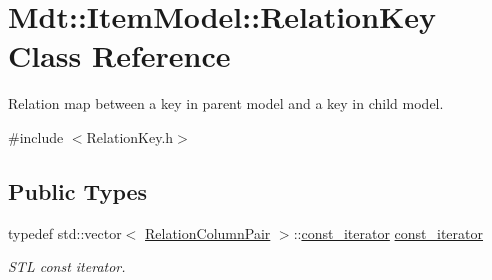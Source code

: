 \hypertarget{class_mdt_1_1_item_model_1_1_relation_key}{}\section{Mdt\+:\+:Item\+Model\+:\+:Relation\+Key Class Reference}
\label{class_mdt_1_1_item_model_1_1_relation_key}


Relation map between a key in parent model and a key in child model.  




{\ttfamily \#include $<$Relation\+Key.\+h$>$}

\subsection*{Public Types}
\begin{DoxyCompactItemize}
\item 
typedef std\+::vector$<$ \hyperlink{class_mdt_1_1_item_model_1_1_relation_column_pair}{Relation\+Column\+Pair} $>$\+::\hyperlink{class_mdt_1_1_item_model_1_1_relation_key_a9f5e75ac5ac158d06a10f1114f9d8b5d}{const\+\_\+iterator} \hyperlink{class_mdt_1_1_item_model_1_1_relation_key_a9f5e75ac5ac158d06a10f1114f9d8b5d}{const\+\_\+iterator}\hypertarget{class_mdt_1_1_item_model_1_1_relation_key_a9f5e75ac5ac158d06a10f1114f9d8b5d}{}\label{class_mdt_1_1_item_model_1_1_relation_key_a9f5e75ac5ac158d06a10f1114f9d8b5d}

\begin{DoxyCompactList}\small\item\em S\+TL const iterator. \end{DoxyCompactList}\end{DoxyCompactItemize}
